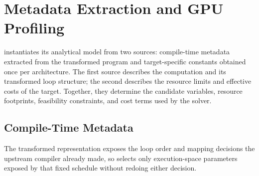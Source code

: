 \section{Metadata Extraction and GPU Profiling}
\label{sec:metadata}

\name instantiates its analytical model from two sources: compile-time metadata extracted from the transformed program and target-specific constants obtained once per \gpu architecture. The first source describes the computation and its transformed loop structure; the second describes the resource limits and effective costs of the target. Together, they determine the candidate variables, resource footprints, feasibility constraints, and cost terms used by the solver.

\subsection{Compile-Time Metadata}
\label{sec:compile-time-metadata}

The transformed representation exposes the loop order and mapping decisions the upstream compiler already made, so \name selects only execution-space parameters exposed by that fixed schedule without redoing either decision.

